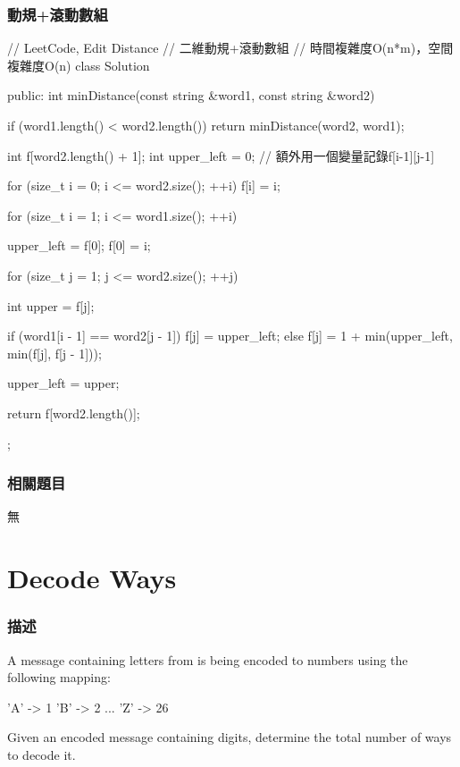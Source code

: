 \subsubsection{動規+滾動數組}
\begin{Code}
// LeetCode, Edit Distance
// 二維動規+滾動數組
// 時間複雜度O(n*m)，空間複雜度O(n)
class Solution {
public:
    int minDistance(const string &word1, const string &word2) {
        if (word1.length() < word2.length())
            return minDistance(word2, word1);

        int f[word2.length() + 1];
        int upper_left = 0; // 額外用一個變量記錄f[i-1][j-1]

        for (size_t i = 0; i <= word2.size(); ++i)
            f[i] = i;

        for (size_t i = 1; i <= word1.size(); ++i) {
            upper_left = f[0];
            f[0] = i;

            for (size_t j = 1; j <= word2.size(); ++j) {
                int upper = f[j];

                if (word1[i - 1] == word2[j - 1])
                    f[j] = upper_left;
                else
                    f[j] = 1 + min(upper_left, min(f[j], f[j - 1]));

                upper_left = upper;
            }
        }

        return f[word2.length()];
    }
};
\end{Code}


\subsubsection{相關題目}
\begindot
\item 無
\myenddot


\section{Decode Ways} %
\label{sec:decode-ways}


\subsubsection{描述}
A message containing letters from  is being encoded to numbers using the following mapping:
\begin{Code}
'A' -> 1
'B' -> 2
...
'Z' -> 26
\end{Code}

Given an encoded message containing digits, determine the total number of ways to decode it.

